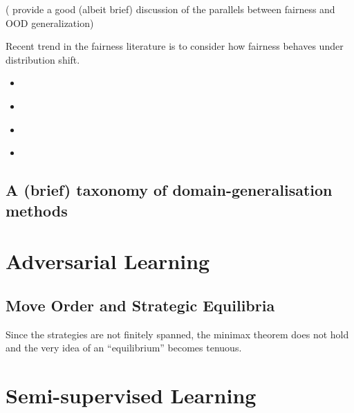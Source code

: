 (\citep{krueger2021out} provide a good (albeit brief) discussion of the parallels between fairness and OOD
generalization)

Recent trend in the fairness literature is to consider how fairness behaves under distribution
shift.
%
\begin{itemize}
  \item \cite{schrouff2022diagnosing}
  \item \cite{schrouff2022maintaining}
  \item \cite{singh2021fairness}
  \item \cite{slack2020fairness}

\end{itemize}


\subsection{A (brief) taxonomy of domain-generalisation methods}
%

\section{Adversarial Learning}\label{sec:adv-learning}
\cite{GooAbaMirXuetal14}
\subsection{Move Order and Strategic Equilibria} 
Since the strategies are not finitely spanned, the
minimax theorem does not hold and the very idea of an ``equilibrium'' becomes tenuous.


\section{ Semi-supervised Learning }\label{sec:SemiSL}
 

